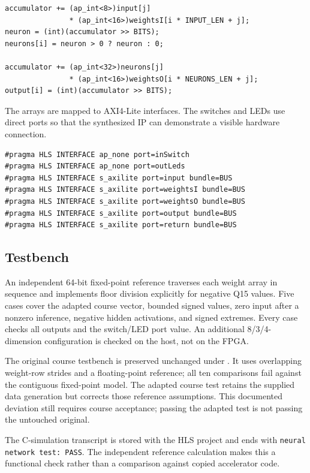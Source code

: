 \documentclass[11pt,a4paper]{article}
\begin{document}
\begin{lstlisting}[style=cppstyle,caption={Hidden and output layer calculations}]
accumulator += (ap_int<8>)input[j]
               * (ap_int<16>)weightsI[i * INPUT_LEN + j];
neuron = (int)(accumulator >> BITS);
neurons[i] = neuron > 0 ? neuron : 0;

accumulator += (ap_int<32>)neurons[j]
               * (ap_int<16>)weightsO[i * NEURONS_LEN + j];
output[i] = (int)(accumulator >> BITS);
\end{lstlisting}

The arrays are mapped to AXI4-Lite interfaces. The switches and LEDs use direct
ports so that the synthesized IP can demonstrate a visible hardware connection.

\begin{lstlisting}[style=cppstyle,caption={HLS interface directives}]
#pragma HLS INTERFACE ap_none port=inSwitch
#pragma HLS INTERFACE ap_none port=outLeds
#pragma HLS INTERFACE s_axilite port=input bundle=BUS
#pragma HLS INTERFACE s_axilite port=weightsI bundle=BUS
#pragma HLS INTERFACE s_axilite port=weightsO bundle=BUS
#pragma HLS INTERFACE s_axilite port=output bundle=BUS
#pragma HLS INTERFACE s_axilite port=return bundle=BUS
\end{lstlisting}

\subsection{Testbench}
An independent 64-bit fixed-point reference traverses each weight array in
sequence and implements floor division explicitly for negative Q15 values.
Five cases cover the adapted course vector, bounded signed values, zero input
after a nonzero inference, negative hidden activations, and signed extremes.
Every case checks all outputs and the switch/LED port value. An additional
8/3/4-dimension configuration is checked on the host, not on the FPGA.

The original course testbench is preserved unchanged under
. It uses overlapping weight-row strides and a
floating-point reference; all ten comparisons fail against the contiguous
fixed-point model. The adapted course test retains the supplied data generation
but corrects those reference assumptions. This documented deviation still
requires course acceptance; passing the adapted test is not passing the
untouched original.

The C-simulation transcript is stored with the HLS project and ends with
\texttt{neural network test: PASS}. The independent reference calculation makes
this a functional check rather than a comparison against copied accelerator
code.
\end{document}
